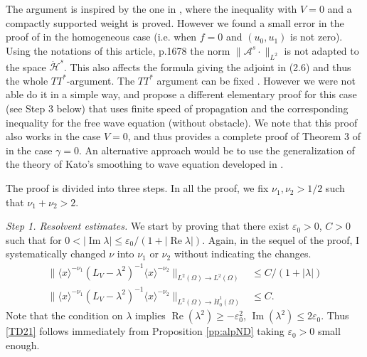 \documentclass[10pt,leqno]{amsart}
\DeclareMathOperator{\im}{Im} %
\DeclareMathOperator{\re}{Re} %
\theoremstyle{definition}%
\theoremstyle{remark}
\numberwithin{equation}{section}
\def\eps{\varepsilon}
\renewcommand{\^}{\widehat}%
\begin{document}



	The argument is inspired by the one in \cite{Burq03}, where the inequality with $V=0$ and a compactly supported weight is proved. However we found a small error in the proof of \cite{Burq03} in the homogeneous case (i.e. when $f=0$ and $(u_0,u_1)$ is not zero). Using the notations of this article, p.1678 the norm $\|\mathcal{A}^s \cdot\|_{L^2}$ is not adapted to the space $\dot{\mathcal{H}}^s$. This also affects the formula giving the adjoint in (2.6) and thus the whole $T T^*$-argument. %
	The $TT^*$ argument can be fixed \cite{BurqPC}. However  we were not able do it in a simple way, and propose a different elementary proof for this case (see Step 3 below) that uses finite speed of propagation and the corresponding inequality for the free wave equation (without obstacle). We note that this proof also works in the case $V=0$, and thus provides a complete proof of Theorem 3 of \cite{Burq03} in the case $\gamma=0$. An alternative approach would be to use the generalization of the theory of Kato's smoothing to wave equation developed in \cite{DAncona14}.
	
	The proof is divided into three steps. In all the proof, we fix $\nu_1,\nu_2>1/2$ such that $\nu_1+\nu_2>2$.
	\medskip
	
	
	\noindent\emph{ Step 1. Resolvent estimates.}
	We start by proving that there exist $\eps_0>0$, $C>0$ such that for $0<|\im \lambda|\leq \eps_0/(1+|\re\lambda|)$. Again, in the sequel of the proof, I systematically changed $\nu$ into $\nu_1$ or $\nu_2$ without indicating the changes.
	\begin{align}
	\label{TD21}
	\| \langle x\rangle^{-\nu_1} (L_V-\lambda^2)^{-1}\langle x\rangle^{-\nu_2}\|_{L^2(\Omega)\to L^2(\Omega)}& \leq C/(1+|\lambda|)\\
	\label{TD22}
	\|\langle x\rangle^{-\nu_1}(L_V-\lambda^2)^{-1}\langle x\rangle^{-\nu_2}\|_{L^2(\Omega)\to \dot{ H}^1_0(\Omega)}&\leq C.
	\end{align}
	Note that the condition on $\lambda$ implies $\re (\lambda^2)\geq -\eps_0^2$, $\im (\lambda^2)\leq 2\eps_0$. Thus \eqref{TD21} follows immediately from Proposition \ref{pp:alpND} taking $\eps_0>0$ small enough.
	
\end{document}
